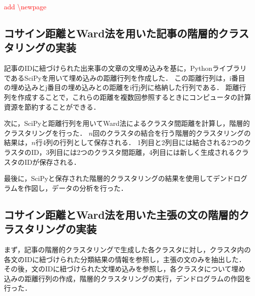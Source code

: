 \documentclass[12pt,a4j]{jreport}
\begin{document}



\textcolor{red}{add \textbackslash newpage}
\newpage


\subsection{コサイン距離とWard法を用いた記事の階層的クラスタリングの実装}
記事のIDに紐づけられた出来事の文章の文埋め込みを基に，PythonライブラリであるSciPyを用いて埋め込みの距離行列を作成した．
この距離行列は，i番目の埋め込みとj番目の埋め込みとの距離をi行j列に格納した行列である．
距離行列を作成することで，これらの距離を複数回参照するときにコンピュータの計算資源を節約することができる．

次に，SciPyと距離行列を用いてWard法によるクラスタ間距離を計算し，階層的クラスタリングを行った．
$n$回のクラスタの結合を行う階層的クラスタリングの結果は，$n$行4列の行列として保存される．
1列目と2列目には結合される2つのクラスタのID，3列目には2つのクラスタ間距離，4列目には新しく生成されるクラスタのIDが保存される．

最後に，SciPyと保存された階層的クラスタリングの結果を使用してデンドログラムを作図し，データの分析を行った．


\subsection{コサイン距離とWard法を用いた主張の文の階層的クラスタリングの実装}
まず，記事の階層的クラスタリングで生成した各クラスタに対し，クラスタ内の各文のIDに紐づけられた分類結果の情報を参照し，主張の文のみを抽出した．
その後，文のIDに紐づけられた文埋め込みを参照し，各クラスタについて埋め込みの距離行列の作成，階層的クラスタリングの実行，デンドログラムの作図を行った．
\end{document}
